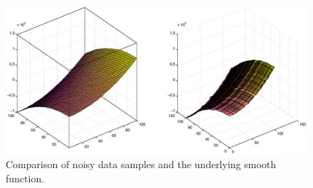 \documentclass[12pt,a4paper]{article}
\begin{document}
\begin{figure}[hbtp]
\centering
\includegraphics[width=\textwidth]{approxVSInterpol.eps}
\caption{Comparison of noisy data samples and the underlying smooth function.}
\label{fig:aVSi}
\end{figure}
\end{document}
